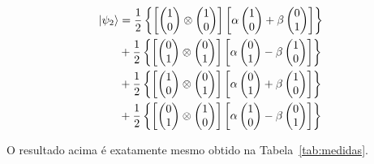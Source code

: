 \begin{equation}
  \begin{split}
\ket{\psi_2} &=\frac{1}{2} \left\{ \left[\begin{pmatrix}
1 \\
0
\end{pmatrix} \otimes \begin{pmatrix}
1 \\
0
\end{pmatrix}\right] \left[\alpha \begin{pmatrix}
1 \\
0
\end{pmatrix} + \beta \begin{pmatrix}
0 \\
1
\end{pmatrix}\right]\right\} \nonumber \\
&+\frac{1}{2} \left\{ \left[\begin{pmatrix}
0 \\
1
\end{pmatrix} \otimes \begin{pmatrix}
0 \\
1
\end{pmatrix}\right] \left[\alpha \begin{pmatrix}
0 \\
1
\end{pmatrix} - \beta \begin{pmatrix}
1 \\
0
\end{pmatrix}\right]\right\} \nonumber \\
&+\frac{1}{2} \left\{\left[ \begin{pmatrix}
1 \\
0
\end{pmatrix} \otimes \begin{pmatrix}
0 \\
1
\end{pmatrix}\right] \left[\alpha \begin{pmatrix}
0 \\
1
\end{pmatrix} + \beta \begin{pmatrix}
1 \\
0
\end{pmatrix}\right]\right\} \nonumber \\
&+\frac{1}{2} \left\{ \left[ \begin{pmatrix}
0 \\
1
\end{pmatrix} \otimes \begin{pmatrix}
1 \\
0
\end{pmatrix}\right] \left[\alpha \begin{pmatrix}
1 \\
0
\end{pmatrix} - \beta \begin{pmatrix}
0 \\
1
\end{pmatrix}\right] \right\}
  \end{split}
\end{equation}

O resultado acima é exatamente mesmo obtido na Tabela~\ref{tab:medidas}.

